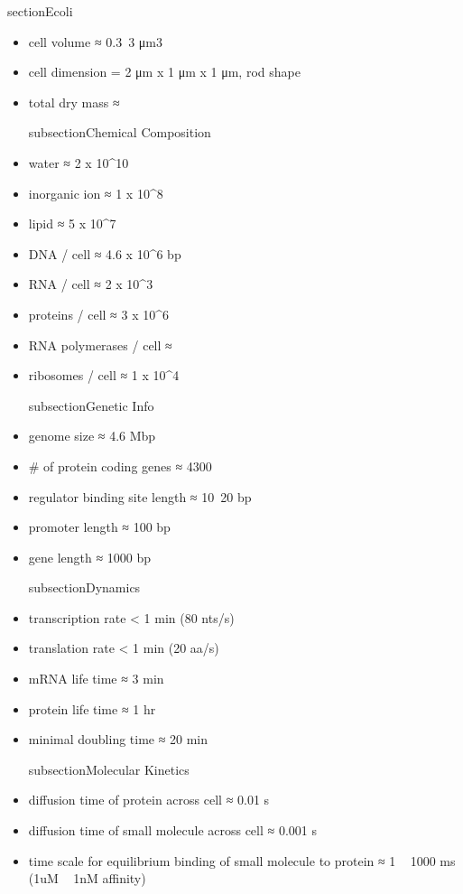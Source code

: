 \documentclass{article}
\begin{document}
    section{Ecoli}
    \begin{itemize}
        subsection{Physical Specification}
        \item cell volume ≈ 0.3~3 μm3    
        \item cell dimension = 2 μm x 1 μm x 1 μm, rod shape
        \item total dry mass ≈
        
        subsection{Chemical Composition}
        \item water ≈ 2 x 10^{10}
        \item inorganic ion ≈ 1 x 10^{8}
        \item lipid ≈ 5 x 10^{7}
        \item DNA / cell ≈ 4.6 x 10^{6} bp
        \item RNA / cell ≈ 2 x 10^{3}
        \item proteins / cell ≈ 3 x 10^{6}
        \item RNA polymerases / cell ≈
        \item ribosomes / cell ≈ 1 x 10^{4}

        subsection{Genetic Info}
        \item genome size ≈ 4.6 Mbp
        \item # of protein coding genes ≈ 4300
        \item regulator binding site length ≈ 10~20 bp
        \item promoter length ≈ 100 bp
        \item gene length ≈ 1000 bp

        subsection{Dynamics}
        \item transcription rate < 1 min (80 nts/s)
        \item translation rate < 1 min (20 aa/s)
        \item mRNA life time ≈ 3 min
        \item protein life time ≈ 1 hr
        \item minimal doubling time ≈ 20 min

        subsection{Molecular Kinetics}
        \item diffusion time of protein across cell ≈ 0.01 s
        \item diffusion time of small molecule across cell ≈ 0.001 s
        \item time scale for equilibrium binding of small molecule to protein ≈ 1 ~ 1000 ms (1uM ~ 1nM affinity)

    \end{itemize}    
\end{document}
